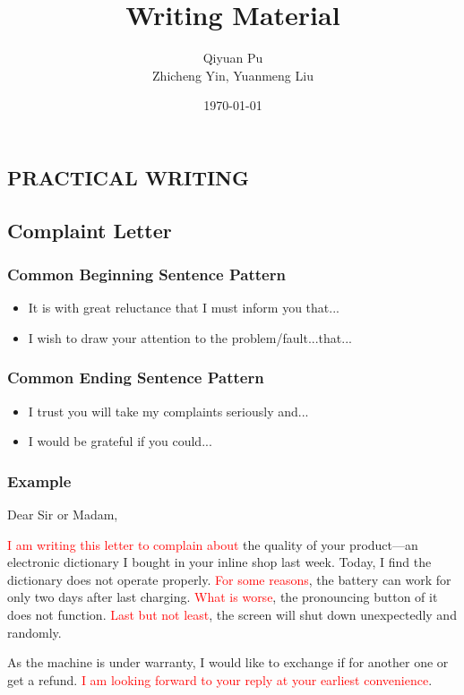 \documentclass{article}
\begin{document}
\title{Writing Material}
\author{Qiyuan Pu  \\
  Zhicheng Yin, Yuanmeng Liu 
  }
\date{\today}
\maketitle

\begin{center}
  \section{PRACTICAL WRITING}
\end{center}
\label{sec:practical-writings}

\subsection{Complaint Letter}
\label{sec:complaint-letter}

\subsubsection{Common Beginning Sentence Pattern}
\label{sec:comm-beginn-sent}

\begin{itemize}
\item It is with great reluctance that I must inform you that...
\item I wish to draw your attention to the problem/fault...that...
\end{itemize}


\subsubsection{Common Ending Sentence Pattern}
\label{sec:comm-ending-sent}
\begin{itemize}
\item I trust you will take my complaints seriously and...
\item I would be grateful if you could...
\end{itemize}

\subsubsection{Example}
\label{sec:example}

Dear Sir or Madam,
\par \textcolor{red}{I am writing this letter to complain about} the quality of your product---an electronic
dictionary I bought in your inline shop last week. Today, I find the dictionary does not
operate properly. \textcolor{red}{For some reasons}, the battery can work for only two days after last
charging. \textcolor{red}{What is worse}, the pronouncing button of it does not
function. \textcolor{red}{Last but not least}, the screen will shut down unexpectedly and
randomly.
\par As the machine is under warranty, I would like to exchange if for another one or get
a refund. \textcolor{red}{I am looking forward to your reply at your earliest
  convenience}.
\end{document}
